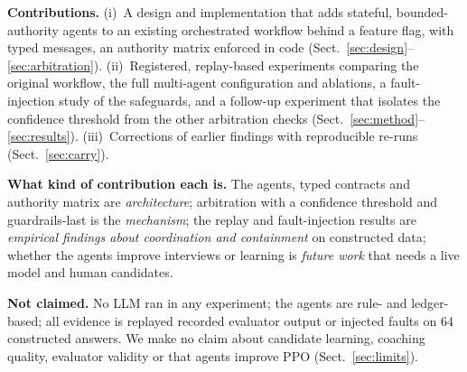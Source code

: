 \noindent\textbf{Contributions.} (i)~A design and implementation that adds stateful, bounded-authority agents to an existing orchestrated workflow behind a feature flag, with typed messages, an authority matrix enforced in code (Sect.~\ref{sec:design}--\ref{sec:arbitration}). (ii)~Registered, replay-based experiments comparing the original workflow, the full multi-agent configuration and ablations, a fault-injection study of the safeguards, and a follow-up experiment that isolates the confidence threshold from the other arbitration checks (Sect.~\ref{sec:method}--\ref{sec:results}). (iii)~Corrections of earlier findings with reproducible re-runs (Sect.~\ref{sec:carry}).

\noindent\textbf{What kind of contribution each is.} The agents, typed contracts and authority matrix are \emph{architecture}; arbitration with a confidence threshold and guardrails-last is the \emph{mechanism}; the replay and fault-injection results are \emph{empirical findings about coordination and containment} on constructed data; whether the agents improve interviews or learning is \emph{future work} that needs a live model and human candidates.

\noindent\textbf{Not claimed.} No LLM ran in any experiment; the agents are rule- and ledger-based; all evidence is replayed recorded evaluator output or injected faults on 64 constructed answers. We make no claim about candidate learning, coaching quality, evaluator validity or that agents improve PPO (Sect.~\ref{sec:limits}).
